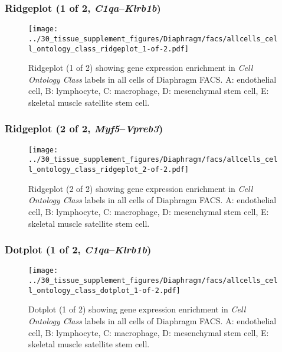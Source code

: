\subsubsection{Ridgeplot (1 of 2, \emph{C1qa}--\emph{Klrb1b})}
\begin{figure}[h]
\centering
\texttt{[image: ../30\_tissue\_supplement\_figures/Diaphragm/facs/allcells\_cell\_ontology\_class\_ridgeplot\_1-of-2.pdf]}

\caption{ Ridgeplot (1 of 2)  showing gene expression enrichment in \emph{Cell Ontology Class} labels in all cells of Diaphragm FACS. A: endothelial cell, B: lymphocyte, C: macrophage, D: mesenchymal stem cell, E: skeletal muscle satellite stem cell.}
\end{figure}


\clearpage

\subsubsection{Ridgeplot (2 of 2, \emph{Myf5}--\emph{Vpreb3})}
\begin{figure}[h]
\centering
\texttt{[image: ../30\_tissue\_supplement\_figures/Diaphragm/facs/allcells\_cell\_ontology\_class\_ridgeplot\_2-of-2.pdf]}

\caption{ Ridgeplot (2 of 2)  showing gene expression enrichment in \emph{Cell Ontology Class} labels in all cells of Diaphragm FACS. A: endothelial cell, B: lymphocyte, C: macrophage, D: mesenchymal stem cell, E: skeletal muscle satellite stem cell.}
\end{figure}


\clearpage

\subsubsection{Dotplot (1 of 2, \emph{C1qa}--\emph{Klrb1b})}
\begin{figure}[h]
\centering
\texttt{[image: ../30\_tissue\_supplement\_figures/Diaphragm/facs/allcells\_cell\_ontology\_class\_dotplot\_1-of-2.pdf]}

\caption{ Dotplot (1 of 2)  showing gene expression enrichment in \emph{Cell Ontology Class} labels in all cells of Diaphragm FACS. A: endothelial cell, B: lymphocyte, C: macrophage, D: mesenchymal stem cell, E: skeletal muscle satellite stem cell.}
\end{figure}


\clearpage

